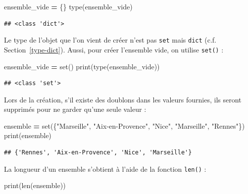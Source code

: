 \documentclass[
  12pt,
]{book}
\newenvironment{Shaded}{\begin{snugshade}}{\end{snugshade}}
\newcommand{\BuiltInTok}[1]{#1}
\newcommand{\NormalTok}[1]{#1}
\newcommand{\OperatorTok}[1]{\textcolor[rgb]{0.81,0.36,0.00}{\textbf{#1}}}
\newcommand{\StringTok}[1]{\textcolor[rgb]{0.31,0.60,0.02}{#1}}
\numberwithin{equation}{section}
\numberwithin{countremarque}{section}
\begin{document}
\begin{Shaded}
\begin{Highlighting}[]
\NormalTok{ensemble\_vide }\OperatorTok{=}\NormalTok{ \{\}}
\BuiltInTok{type}\NormalTok{(ensemble\_vide)}
\end{Highlighting}
\end{Shaded}

\begin{lstlisting}
## <class 'dict'>
\end{lstlisting}

Le type de l'objet que l'on vient de créer n'est pas \texttt{set} mais \texttt{dict} (c.f. Section~\ref{type-dict}). Aussi, pour créer l'ensemble vide, on utilise \texttt{set()} :

\begin{Shaded}
\begin{Highlighting}[]
\NormalTok{ensemble\_vide }\OperatorTok{=} \BuiltInTok{set}\NormalTok{()}
\BuiltInTok{print}\NormalTok{(}\BuiltInTok{type}\NormalTok{(ensemble\_vide))}
\end{Highlighting}
\end{Shaded}

\begin{lstlisting}
## <class 'set'>
\end{lstlisting}

Lors de la création, s'il existe des doublons dans les valeurs fournies, ils seront supprimés pour ne garder qu'une seule valeur :

\begin{Shaded}
\begin{Highlighting}[]
\NormalTok{ensemble }\OperatorTok{=} \BuiltInTok{set}\NormalTok{(\{}\StringTok{"Marseille"}\NormalTok{, }\StringTok{"Aix{-}en{-}Provence"}\NormalTok{, }\StringTok{"Nice"}\NormalTok{, }\StringTok{"Marseille"}\NormalTok{, }\StringTok{"Rennes"}\NormalTok{\})}
\BuiltInTok{print}\NormalTok{(ensemble)}
\end{Highlighting}
\end{Shaded}

\begin{lstlisting}
## {'Rennes', 'Aix-en-Provence', 'Nice', 'Marseille'}
\end{lstlisting}

La longueur d'un ensemble s'obtient à l'aide de la fonction \texttt{len()} :

\begin{Shaded}
\begin{Highlighting}[]
\BuiltInTok{print}\NormalTok{(}\BuiltInTok{len}\NormalTok{(ensemble))}
\end{Highlighting}
\end{Shaded}
\end{document}
